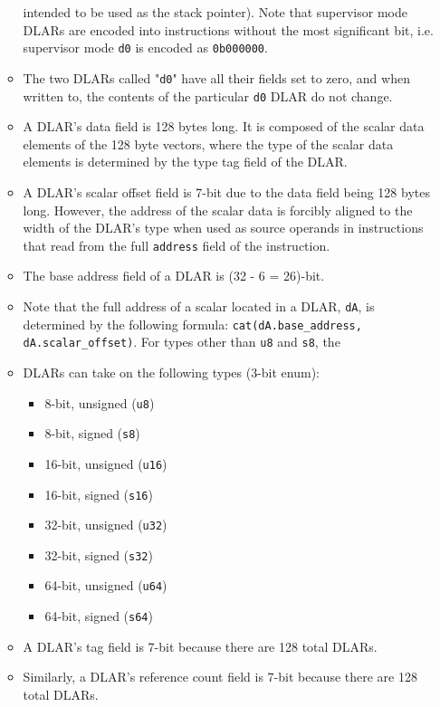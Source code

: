 \documentclass{article}
\begin{document}
\begin{itemize}
\begin{itemize}
				intended to be used as the stack pointer).
			Note that supervisor mode DLARs are encoded into instructions
			without the most significant bit, i.e. supervisor mode
			\texttt{d0} is encoded as \texttt{0b000000}.
		\item The two DLARs called "\texttt{d0}" have all their fields set
			to zero, and when written to, the contents of the particular
			\texttt{d0} DLAR do not change.
		\item A DLAR's data field is 128 bytes long. It is composed of the
			scalar data elements of the 128 byte vectors, where the type of
			the scalar data elements is determined by the type tag field of
			the DLAR.
		\item A DLAR's scalar offset field is 7-bit due to the data field
			being 128 bytes long. However, the address of the scalar data
			is forcibly aligned to the width of the DLAR's type when used
			as source operands in instructions that read from the full
			\texttt{address} field of the instruction.
		\item The base address field of a DLAR is (32 - 6 = 26)-bit.
		\item Note that the full address of a scalar located in a DLAR,
			\texttt{dA}, is determined by the following formula:
			\texttt{cat(dA.base\_address, dA.scalar\_offset)}. For types
			other than \texttt{u8} and \texttt{s8}, the  
		\item DLARs can take on the following types (3-bit enum):
			\begin{itemize}
			\item 8-bit, unsigned (\texttt{u8})
			\item 8-bit, signed (\texttt{s8})
			\item 16-bit, unsigned (\texttt{u16})
			\item 16-bit, signed (\texttt{s16})
			\item 32-bit, unsigned (\texttt{u32})
			\item 32-bit, signed (\texttt{s32})
			\item 64-bit, unsigned (\texttt{u64})
			\item 64-bit, signed (\texttt{s64})
			\end{itemize}
		\item A DLAR's tag field is 7-bit because there are 128 total
			DLARs.
		\item Similarly, a DLAR's reference count field is 7-bit because
			there are 128 total DLARs.

\end{itemize}
\end{itemize}
\end{document}

